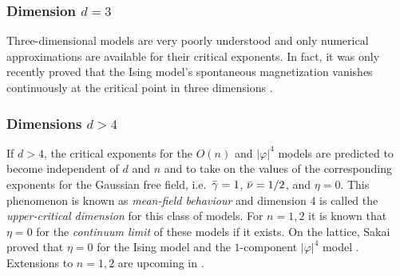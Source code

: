 
\subsubsection{Dimension $d=3$}

Three-dimensional models are very poorly understood and only numerical approximations
are available for their critical exponents. In fact, it was only recently proved
that the Ising model's spontaneous magnetization vanishes continuously at
the critical point in three dimensions \cite{ADS15}.

\subsubsection{Dimensions $d > 4$}

If $d > 4$, the critical exponents for the $O(n)$ and $|\varphi|^4$ models are
predicted to become independent of $d$ and $n$ and to take on the values of the
corresponding exponents for the Gaussian free field, i.e.\ $\bar\gamma = 1$,
$\bar\nu = 1/2$, and $\eta = 0$.
This phenomenon is known as \emph{mean-field behaviour} and dimension $4$ is
called the \emph{upper-critical dimension} for this class of models.
For $n = 1, 2$ it is known that $\eta = 0$
for the \emph{continuum limit} of these models \cite{Aiz82,Fro82} if it exists.
On the lattice, Sakai proved that $\eta = 0$ for the Ising model \cite{Sakai07}
and the $1$-component $|\varphi|^4$ model \cite{Sakai15}.
Extensions to $n = 1, 2$ are upcoming in \cite{BHH17}.

